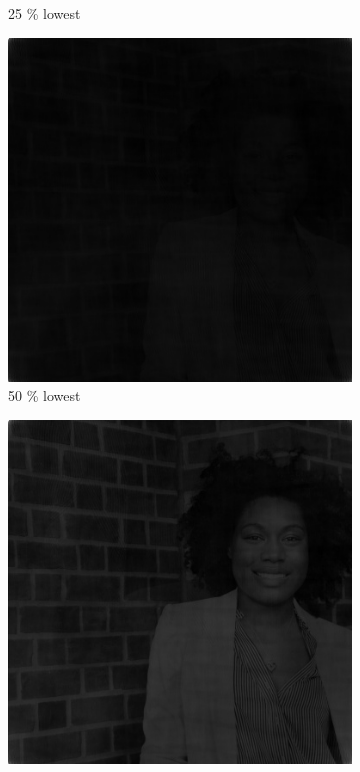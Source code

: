 \begin{figure}[h!]
\begin{subfigure}{0.2\textwidth}
  \caption{25 \% lowest}
\end{subfigure}%
\begin{subfigure}{0.2\textwidth}
  \centering
  \includegraphics[width=0.95\linewidth]{output/phase_low_50.jpg}
  \caption{50 \% lowest}
\end{subfigure}%
\begin{subfigure}{0.2\textwidth}
  \centering
  \includegraphics[width=0.95\linewidth]{output/phase_low_75.jpg}

\end{subfigure}
\end{figure}

